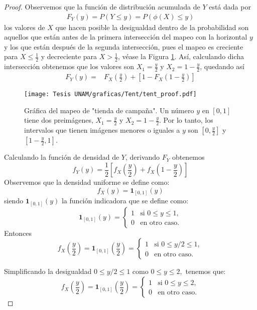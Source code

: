 \documentclass[../Main.tex]{subfiles}
\begin{document}
\begin{proof}
Observemos que la función de distribución acumulada de $Y$ está dada por \begin{align*}
    F_Y(y)=P(Y\leq y)=P(\phi(X)\leq y)
\end{align*}
los valores de $X$ que hacen posible la desigualdad dentro de la probabilidad son aquellos que están antes de la primera intersección del mapeo con la horizontal $y$ y los que están después de la segunda intersección, pues el mapeo es creciente para $X\leq \frac{1}{2}$ y decreciente para $X>\frac{1}{2}$, véase la Figura \ref{fig:tent_proof}. Así, calculando dicha intersección obtenemos que los valores son $X_1=\frac{y}{2}$ y $X_2=1-\frac{y}{2}$, quedando así 
\begin{align*}
    F_Y(y)=&F_X\left(\frac{y}{2}\right)+\left[1-F_X\left(1-\frac{y}{2}\right)\right]
\end{align*}

\begin{figure}[h]
    \centering
    \texttt{[image: Tesis UNAM/graficas/Tent/tent\_proof.pdf]}
    \caption{Gráfica del mapeo de "tienda de campaña". Un número $y$ en $[0,1]$ tiene dos preimágenes, $X_1=\frac{y}{2}$ y $X_2=1-\frac{y}{2}$. Por lo tanto, los intervalos que tienen imágenes menores o iguales a $y$ son $[0,\frac{y}{2}]$ y $[1-\frac{y}{2},1]$.}
    \label{fig:tent_proof}
\end{figure} 

Calculando la función de densidad de $Y$, derivando $F_Y$ obtenemos 
\begin{equation}
    f_Y(y)=\frac{1}{2}\left[f_X\left(\frac{y}{2}\right)+f_X\left(1-\frac{y}{2}\right)\right]
    \label{eq:dens_Y_tent}
\end{equation}
Observemos que la densidad uniforme se define como:
\[f_X(y)=\mathbf{1}_{[0,1]}(y)\] siendo \(\mathbf{1}_{[0,1]}(y)\) la función indicadora que se define como:
\[
\mathbf{1}_{[0,1]}(y) = 
\begin{cases}
1 & \text{si } 0 \leq y \leq 1, \\
0 & \text{en otro caso}.
\end{cases}
\]
Entonces \[f_X\left(\frac{y}{2}\right)=\mathbf{1}_{[0,1]}\left(\frac{y}{2}\right)=
\begin{cases}
1 & \text{si } 0 \leq y/2 \leq 1, \\
0 & \text{en otro caso}.
\end{cases}\]


Simplificando la desigualdad \(0 \leq y/2 \leq 1\) como \(
0 \leq y \leq 2,
\)
tenemos que:
\[
f_X\left(\frac{y}{2}\right)=\mathbf{1}_{[0,1]}\left(\frac{y}{2}\right) = 
\begin{cases}
1 & \text{si } 0 \leq y \leq 2, \\
0 & \text{en otro caso}.
\end{cases}
\]


\end{proof}
\end{document}
